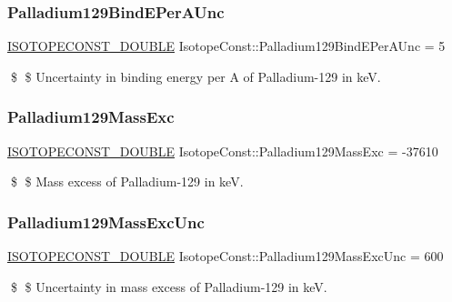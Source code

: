 \subsubsection{\texorpdfstring{Palladium129\+Bind\+E\+Per\+A\+Unc}{Palladium129BindEPerAUnc}}
{\footnotesize\ttfamily \mbox{\hyperlink{group___isotope_const-_macros_ga8f45a7272ce02c0b4c65c44636ed719a}{I\+S\+O\+T\+O\+P\+E\+C\+O\+N\+S\+T\+\_\+\+D\+O\+U\+B\+LE}} Isotope\+Const\+::\+Palladium129\+Bind\+E\+Per\+A\+Unc = 5}

\$ \$ Uncertainty in binding energy per A of Palladium-\/129 in keV. \mbox{\label{group___isotope_const-_palladium-_pd129_ga38e30aa04c4e92d922c0029a69607bfb}} 
\subsubsection{\texorpdfstring{Palladium129\+Mass\+Exc}{Palladium129MassExc}}
{\footnotesize\ttfamily \mbox{\hyperlink{group___isotope_const-_macros_ga8f45a7272ce02c0b4c65c44636ed719a}{I\+S\+O\+T\+O\+P\+E\+C\+O\+N\+S\+T\+\_\+\+D\+O\+U\+B\+LE}} Isotope\+Const\+::\+Palladium129\+Mass\+Exc = -\/37610}

\$ \$ Mass excess of Palladium-\/129 in keV. \mbox{\label{group___isotope_const-_palladium-_pd129_gabe421fce72fa6877cb46818cda783f55}} 
\subsubsection{\texorpdfstring{Palladium129\+Mass\+Exc\+Unc}{Palladium129MassExcUnc}}
{\footnotesize\ttfamily \mbox{\hyperlink{group___isotope_const-_macros_ga8f45a7272ce02c0b4c65c44636ed719a}{I\+S\+O\+T\+O\+P\+E\+C\+O\+N\+S\+T\+\_\+\+D\+O\+U\+B\+LE}} Isotope\+Const\+::\+Palladium129\+Mass\+Exc\+Unc = 600}

\$ \$ Uncertainty in mass excess of Palladium-\/129 in keV. \mbox{\label{group___isotope_const-_palladium-_pd129_gadda6b6574b3cb165d64b609db87559c1}} 

